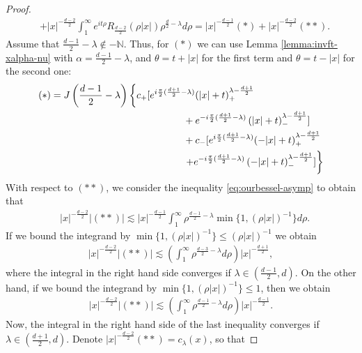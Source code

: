 \documentclass[a4paper, reqno, 11pt]{amsart}
\theoremstyle{definition}
\begin{document}
\begin{proof}
\begin{align*}
&+ |x|^{-\frac{d-2}{2}} \int_{1}^{\infty} e^{it\rho} R_{\frac{d-2}{2}}(\rho |x|) \rho^{\frac{d}{2} -\lambda} d\rho   = |x|^{-\frac{d-1}{2}}(*) + |x|^{-\frac{d-2}{2}}(**).
\end{align*}
Assume that $\frac{d-1}{2} - \lambda \notin -\mathbb{N}$. Thus, for $(*)$ we can use Lemma \ref{lemma:invft-xalpha-nu} with $\alpha = \frac{d-1}{2} - \lambda$, and $\theta = t + |x|$ for the first term and $\theta = t - |x|$ for the second one:
\begin{align*}
(*) &= J\left(\frac{d-1}{2}-\lambda\right) \left\{c_+ [ e^{i\frac{\pi}{2}(\frac{d+1}{2} - \lambda)} (|x| + t)_+^{\lambda-\frac{d+1}{2}}\right. \\
&\hspace{48mm} + e^{-i\frac{\pi}{2}(\frac{d+1}{2} - \lambda)} \left(|x| + t\right)_-^{\lambda-\frac{d+1}{2}}] \nonumber \\
&\hspace{48mm} + c_-  [ e^{i\frac{\pi}{2}(\frac{d+1}{2} - \lambda)}(-|x| + t)_+^{\lambda-\frac{d+1}{2}} \\
&\left. \hspace{48mm}+ e^{-i\frac{\pi}{2}(\frac{d+1}{2} - \lambda)} \left( -|x| + t\right)_-^{\lambda-\frac{d+1}{2}} ] \right\}
\end{align*}
With respect to $(**)$, we consider the inequality \eqref{eq:ourbessel-asymp} to obtain that
\begin{align*}
&|x|^{-\frac{d-2}{2}}\left|  (**) \right| \lesssim |x|^{-\frac{d-1}{2}} \int_{1}^{\infty}\rho^{\frac{d-1}{2} - \lambda} \min\{ 1 , (\rho|x|)^{-1} \} d\rho \nonumber.
\end{align*}
If we bound the integrand by $\min\{ 1 , (\rho|x|)^{-1} \} \leq (\rho|x|)^{-1}$ we obtain
\begin{align*}
|x|^{-\frac{d-2}{2}}\left|  (**) \right| \lesssim \left( \int_{1}^{\infty} \rho^{\frac{d-3}{2} - \lambda} d\rho \right) |x|^{-\frac{d+1}{2}},
\end{align*}
where the integral in the right hand side converges if $\lambda \in (\frac{d-1}{2},d)$. On the other hand, if we bound the integrand by $\min\{ 1 , (\rho|x|)^{-1} \} \leq 1$, then we obtain
\begin{align*}
|x|^{-\frac{d-2}{2}}\left|  (**) \right| \lesssim \left( \int_1^{\infty} \rho^{\frac{d-1}{2} - \lambda} d\rho \right) |x|^{-\frac{d-1}{2}}.
\end{align*}
Now, the integral in the right hand side of the last inequality converges if $\lambda \in (\frac{d+1}{2},d)$. Denote $|x|^{-\frac{d-2}{2}} (**) = c_{\lambda}(x)$, so that 

\end{proof}
\end{document}
